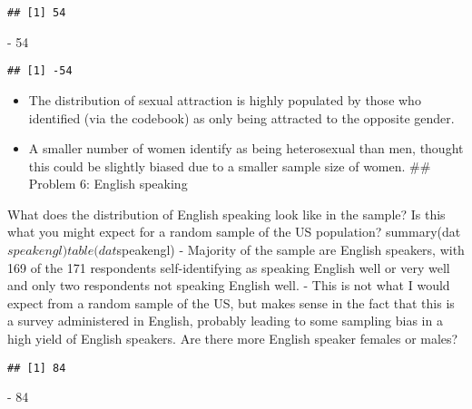 \documentclass[
]{article}
\newenvironment{Shaded}{\begin{snugshade}}{\end{snugshade}}
\newcommand{\DecValTok}[1]{\textcolor[rgb]{0.00,0.00,0.81}{#1}}
\newcommand{\FunctionTok}[1]{\textcolor[rgb]{0.00,0.00,0.00}{#1}}
\newcommand{\NormalTok}[1]{#1}
\newcommand{\SpecialCharTok}[1]{\textcolor[rgb]{0.00,0.00,0.00}{#1}}
\providecommand{\tightlist}{%
  \setlength{\itemsep}{0pt}\setlength{\parskip}{0pt}}
\begin{document}
\begin{verbatim}
## [1] 54
\end{verbatim}

\begin{Shaded}
\begin{Highlighting}[]
\SpecialCharTok{{-}} \DecValTok{54}
\end{Highlighting}
\end{Shaded}

\begin{verbatim}
## [1] -54
\end{verbatim}

\begin{itemize}
\tightlist
\item
  The distribution of sexual attraction is highly populated by those who
  identified (via the codebook) as only being attracted to the opposite
  gender.
\item
  A smaller number of women identify as being heterosexual than men,
  thought this could be slightly biased due to a smaller sample size of
  women. \#\# Problem 6: English speaking
\end{itemize}

What does the distribution of English speaking look like in the sample?
Is this what you might expect for a random sample of the US population?
summary(dat\(speakengl) table(dat\)speakengl) - Majority of the sample
are English speakers, with 169 of the 171 respondents self-identifying
as speaking English well or very well and only two respondents not
speaking English well. - This is not what I would expect from a random
sample of the US, but makes sense in the fact that this is a survey
administered in English, probably leading to some sampling bias in a
high yield of English speakers. Are there more English speaker females
or males?

\begin{Shaded}
\end{Shaded}

\begin{verbatim}
## [1] 84
\end{verbatim}

\begin{Shaded}
\begin{Highlighting}[]
\SpecialCharTok{{-}} \DecValTok{84}
\end{Highlighting}
\end{Shaded}
\end{document}
